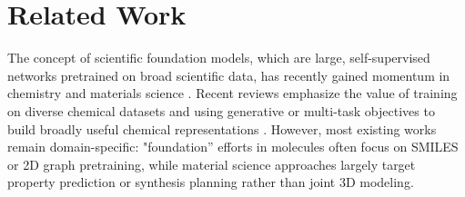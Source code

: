 \documentclass{article}
\theoremstyle{plain}
\theoremstyle{definition}
\theoremstyle{remark}
\begin{document}




\clearpage
\appendix
\onecolumn

\thispagestyle{plain} %
{\center\baselineskip 18pt
\bottomtitlebar}
\vspace*{0cm}

\section{Related Work}
\label{appendix:related_work}

The concept of scientific foundation models, which are large, self-supervised networks pretrained on broad scientific data, has recently gained momentum in chemistry and materials science \citep{PyzerKnapp2025, Choi2025FMchem, edamadaka2025universally}. Recent reviews emphasize the value of training on diverse chemical datasets and using generative or multi-task objectives to build broadly useful chemical representations \citep{PyzerKnapp2025, Choi2025FMchem, wadell2025foundation}. However, most existing works remain domain-specific: "foundation” efforts in molecules often focus on SMILES or 2D graph pretraining, while material science approaches largely target property prediction or synthesis planning rather than joint 3D modeling.
\end{document}
